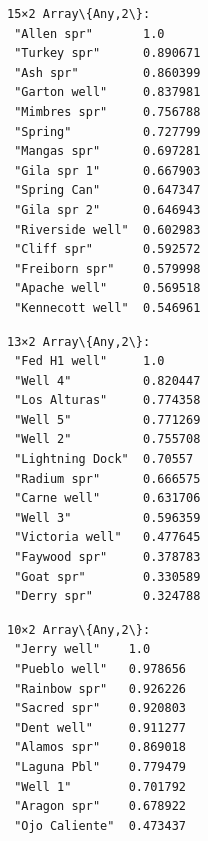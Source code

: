 \documentclass[11pt]{article}
\begin{document}
    
    \begin{Verbatim}[commandchars=\\\{\}]
15×2 Array\{Any,2\}:
 "Allen spr"       1.0
 "Turkey spr"      0.890671
 "Ash spr"         0.860399
 "Garton well"     0.837981
 "Mimbres spr"     0.756788
 "Spring"          0.727799
 "Mangas spr"      0.697281
 "Gila spr 1"      0.667903
 "Spring Can"      0.647347
 "Gila spr 2"      0.646943
 "Riverside well"  0.602983
 "Cliff spr"       0.592572
 "Freiborn spr"    0.579998
 "Apache well"     0.569518
 "Kennecott well"  0.546961
    \end{Verbatim}

    
    
    \begin{Verbatim}[commandchars=\\\{\}]
13×2 Array\{Any,2\}:
 "Fed H1 well"     1.0
 "Well 4"          0.820447
 "Los Alturas"     0.774358
 "Well 5"          0.771269
 "Well 2"          0.755708
 "Lightning Dock"  0.70557
 "Radium spr"      0.666575
 "Carne well"      0.631706
 "Well 3"          0.596359
 "Victoria well"   0.477645
 "Faywood spr"     0.378783
 "Goat spr"        0.330589
 "Derry spr"       0.324788
    \end{Verbatim}

    
    
    \begin{Verbatim}[commandchars=\\\{\}]
10×2 Array\{Any,2\}:
 "Jerry well"    1.0
 "Pueblo well"   0.978656
 "Rainbow spr"   0.926226
 "Sacred spr"    0.920803
 "Dent well"     0.911277
 "Alamos spr"    0.869018
 "Laguna Pbl"    0.779479
 "Well 1"        0.701792
 "Aragon spr"    0.678922
 "Ojo Caliente"  0.473437
    \end{Verbatim}
\end{document}
